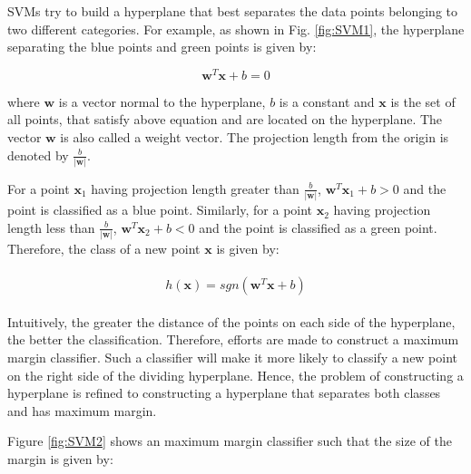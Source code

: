 %


SVMs try to build a hyperplane that best separates the data points belonging to two different categories. For example, as shown in Fig. \ref{fig:SVM1}, the hyperplane separating the blue points and green points is given by:

$$
\mathbf{w}^{T}\mathbf{x} + b = 0
$$

where $\mathbf{w}$ is a vector normal to the hyperplane, $b$ is a constant and  $\mathbf{x}$ is the set of all points, that satisfy above equation and are located on the hyperplane. The vector $\mathbf{w}$ is also called a weight vector. The projection length from the origin is denoted by $\frac{b}{|\mathbf{w}|}$. 

For a point $\mathbf{x}_1$ having projection length greater than $\frac{b}{|\mathbf{w}|}$, $\mathbf{w}^{T}\mathbf{x}_1 + b > 0$ and the point is classified as a blue point. Similarly, for a point $\mathbf{x}_2$ having projection length less than $\frac{b}{|\mathbf{w}|}$, $\mathbf{w}^{T}\mathbf{x}_2 + b < 0$ and the point is classified as a green point. Therefore, the class of a new point $\mathbf{x}$ is given by:

\begin{align}
\begin{aligned}
h(\mathbf{x}) = sgn(\mathbf{w}^{T}\mathbf{x} + b) \label{eq:sgn}
\end{aligned}
\end{align}

Intuitively, the greater the distance of the points on each side of the hyperplane, the better the classification. Therefore, efforts are made to construct a maximum margin classifier.  Such a classifier will make it more likely to classify a new point on the right side of the dividing hyperplane. Hence, the problem of constructing a hyperplane is refined to constructing a hyperplane that separates both classes and has maximum margin.

Figure \ref{fig:SVM2} shows an maximum margin classifier such that the size of the margin is given by:

